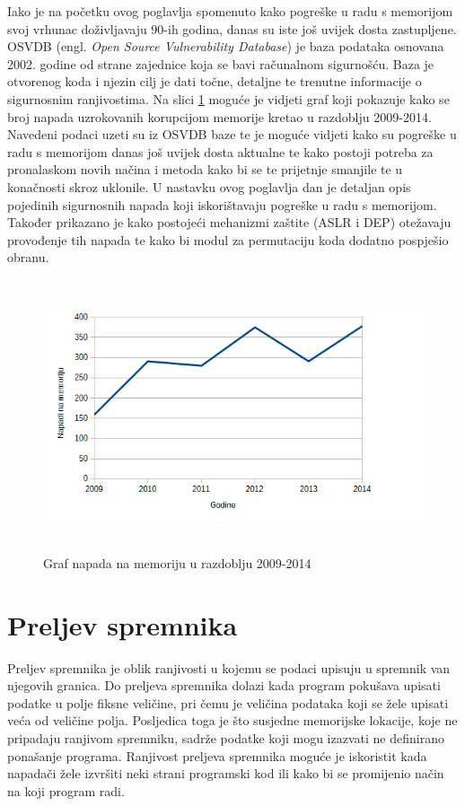 \documentclass[times, utf8, diplomski, numeric]{fer}
\begin{document}
Iako je na početku ovog poglavlja spomenuto kako pogreške u radu
s memorijom svoj vrhunac doživljavaju 90-ih godina,
danas su iste još uvijek dosta zastupljene. OSVDB 
(engl. \emph{Open Source Vulnerability Database}) je baza podataka			%
osnovana 2002. godine od strane zajednice koja se bavi računalnom
sigurnošću. Baza je otvorenog koda i njezin cilj je dati točne,
detaljne te trenutne informacije o sigurnosnim ranjivostima. Na
slici \ref{fig:mem_corruption} moguće je vidjeti graf koji
pokazuje kako se broj napada uzrokovanih korupcijom memorije
kretao u razdoblju 2009-2014. Navedeni podaci uzeti su iz OSVDB
baze te je moguće vidjeti kako su pogreške u radu s memorijom
 danas još uvijek dosta aktualne te kako postoji potreba
za pronalaskom novih načina i metoda kako bi se te prijetnje
smanjile te u konačnosti skroz uklonile. U nastavku ovog
poglavlja dan je detaljan opis pojedinih sigurnosnih napada koji
iskorištavaju pogreške u radu s memorijom. Također
prikazano je kako postojeći mehanizmi zaštite (ASLR i DEP)
otežavaju provođenje tih napada te kako bi modul za permutaciju
koda dodatno pospješio obranu. 

\begin{figure}[!ht]
\centering
\setlength\fboxsep{0pt}
\setlength\fboxrule{0.5pt}
\includegraphics[width=12cm, height=8cm]{slike/memory_corruption}
\caption{Graf napada na memoriju u razdoblju 2009-2014}
\label{fig:mem_corruption} 
\end{figure} 

\section{Preljev spremnika}
\label{sct:bufferOverflow}

Preljev spremnika je oblik ranjivosti u kojemu se podaci upisuju
u spremnik van njegovih granica. Do preljeva spremnika dolazi
kada program pokušava upisati podatke u polje fiksne veličine,
pri čemu je veličina podataka koji se žele upisati veća od
veličine polja. Posljedica toga je što susjedne memorijske
lokacije, koje ne pripadaju ranjivom spremniku, sadrže podatke
koji mogu izazvati ne definirano ponašanje programa. Ranjivost				%
preljeva spremnika moguće je iskoristit kada napadači žele				%
izvršiti neki strani programski kod ili kako bi se promijenio				%
način na koji program radi. 
\end{document}
